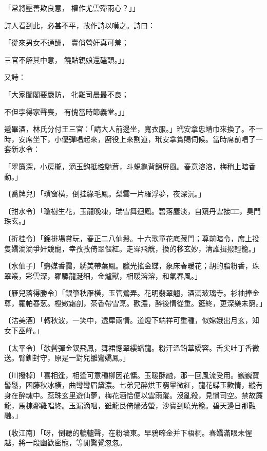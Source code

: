「常將壓善欺良意，  權作尤雲殢雨心？」」

詩人看到此，必甚不平，故作詩以嘆之。詩曰：

「從來男女不通酬，  賣俏營奸真可羞；

三官不解其中意，  饒貼親娘還磕頭。」」

又詩：

「大家閨閣要嚴防，  牝雞司晨最不良；

不但孛得家聲喪，  有愧當時節義堂。」」

遞畢酒，林氏分付王三官：「請大人前邊坐，寬衣服。」玳安拿忠靖巾來換了。不一時，安席坐下，小優彈唱起來，廚役上來割道，玳安拿賞賜伺候。當時席前唱了一套新水令：

「翠簾深，小房櫳，滴玉鈎抵控馳茸，斗蜆龜背錦屏風。春意溶溶，梅稍上暗香動。」

〔喬牌兒〕「瑣窗橫，倒挂綠毛鳳。梨雲一片羅浮夢，夜深沉。」

〔甜水令〕「瓊樹生花，玉龍晚凍，瑞雪舞迴鳳。碧落塵淡，自窺丹雲接□□，臭門珠玄。」

〔折桂令〕「錦排場賞玩，春正二八仙鬟。十六歌童花底藏門；尊前暗令，席上投隻嬌滴滴爭奸競寵，幸孜孜倚翠偎紅。走斝飛觥，換的移玄妙，清誰揖撥輕籠。」

〔水仙子〕「麝媒香靄，綉美帶葉鳳。臘光搖金蝶，象床春暖花；胡的脂粉香，珠翠叢，彩雲深，羅騾龍涎細，金爐獸，相暖溶溶，和氣春風。」

〔雁兒落得勝令〕「銀箏秋雁橫，玉管鶯弄。花明翡翠翹，酒滿玻璃寺。衫袖捧金尊，羅帕春葱。橙嫩霜剖，茶香帶雪烹。歡濃，醉後情從重。筵終，更深樂未窮。」

〔沽美酒〕「轉秋波，一笑中，透犀兩情。道燈下端祥可重種，似嫦娥出月玄，知女下巫峰。」

〔太平令〕「欹鬢彈金釵飛鳳，舞裙憁翠縷蟠龍。粉汗溫鉛華嬌容。舌尖吐丁香微送。臂釧封守，原是一對兒雛鸞嬌鳳。」

〔川撥棹〕「喜相逢，相逢可意種柳因花慵。玉暖酥融，那一回風流受用。巍巍寶髻鬆，困藤秋冰橫，曲彎彎眉黛濃。七弟兄醉烘玉窮暈微紅，龍花蝶玉歡情，縱有身在醉魂中。蕊珠玄里遊仙夢，梅花酒恰便以雲雨蹤。沒亂殺，見慣司空。禁故簾龍，馬棟鄰雞唱終。玉漏滴咽，雖龍艮倚燼落螢，沙寶到曉光籠。碧天邊日那融融。」

〔收江南〕「呀，倒聽的轆轤聲，在粉墻東。早鴉啼金并下梧桐。春嬌滿眼未惺越，將一段幽歡密寵，等閒驚覺忽忽。

